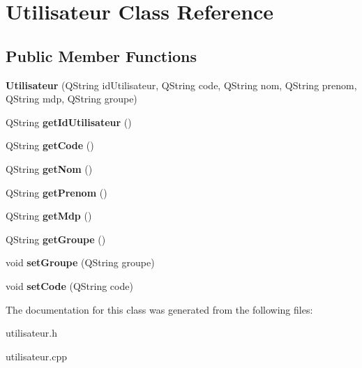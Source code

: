 \hypertarget{class_utilisateur}{}\section{Utilisateur Class Reference}
\label{class_utilisateur}
\subsection*{Public Member Functions}
\begin{DoxyCompactItemize}
\item 
\mbox{\label{class_utilisateur_aab43c0ee89962ff55479cb8f1fd19fa8}} 
{\bfseries Utilisateur} (Q\+String id\+Utilisateur, Q\+String code, Q\+String nom, Q\+String prenom, Q\+String mdp, Q\+String groupe)
\item 
\mbox{\label{class_utilisateur_ac86c327563c837920f2b12c482adffd9}} 
Q\+String {\bfseries get\+Id\+Utilisateur} ()
\item 
\mbox{\label{class_utilisateur_a4b145e96bc7cec4779d4dfefe9b40c35}} 
Q\+String {\bfseries get\+Code} ()
\item 
\mbox{\label{class_utilisateur_a84a4aa7b7f2fde194e9c706a8eb711e5}} 
Q\+String {\bfseries get\+Nom} ()
\item 
\mbox{\label{class_utilisateur_a6b4d6fa5c9b5c8565c2f2d1f68df9bf3}} 
Q\+String {\bfseries get\+Prenom} ()
\item 
\mbox{\label{class_utilisateur_a3d97468fbffac5a17f30a8f61ca9fa10}} 
Q\+String {\bfseries get\+Mdp} ()
\item 
\mbox{\label{class_utilisateur_a7c2a356bebff3424cf58c84ca5698c8b}} 
Q\+String {\bfseries get\+Groupe} ()
\item 
\mbox{\label{class_utilisateur_ad9f88d08f5bc9faed0138d92debf35fa}} 
void {\bfseries set\+Groupe} (Q\+String groupe)
\item 
\mbox{\label{class_utilisateur_aba69ae1c6239270a80768ce540014a92}} 
void {\bfseries set\+Code} (Q\+String code)
\end{DoxyCompactItemize}


The documentation for this class was generated from the following files\+:\begin{DoxyCompactItemize}
\item 
utilisateur.\+h\item 
utilisateur.\+cpp\end{DoxyCompactItemize}

